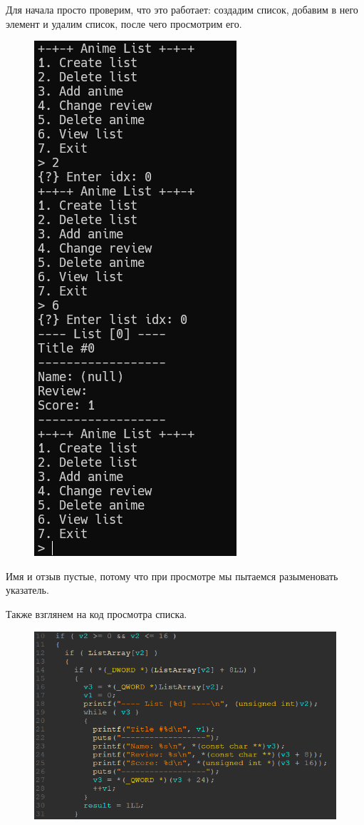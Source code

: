 \documentclass[idxtotoc,hyperref,openany,oneside]{files/pwn} %
\begin{document}
Для начала просто проверим, что это работает: создадим список, добавим в него элемент и удалим список, после чего просмотрим его.
\begin{figure}[H]
\begin{center}
\includegraphics[width=0.5\linewidth]{files/mal-get-libc}
\end{center}
\label{fig:mal-get-libc}
\end{figure}

Имя и отзыв пустые, потому что при просмотре мы пытаемся разыменовать указатель.

Также взглянем на код просмотра списка.
\begin{figure}[H]
\begin{center}
\includegraphics[width=1.0\linewidth]{files/mal-empty-point}
\end{center}
\label{fig:mal-empty-point}
\end{figure}
\end{document}
